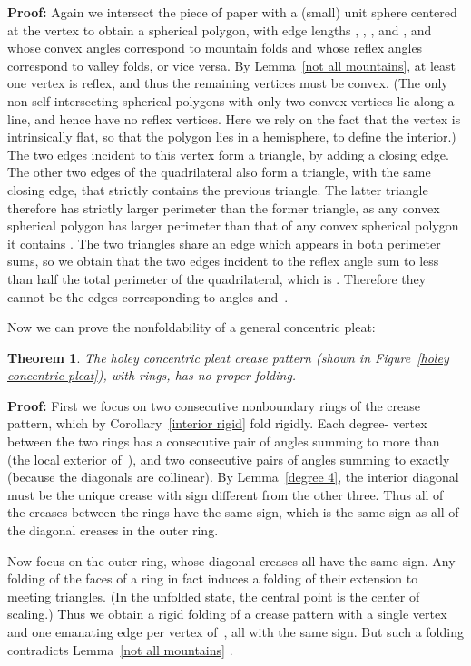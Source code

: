 \documentclass[11pt,letterpaper]{article}
\newtheorem{theorem}{Theorem}
\newenvironment{proof}{\noindent\textbf{Proof: }\ignorespaces}
  {\hspace*{\fill}\medskip}
\begin{document}
\begin{proof}
  Again we intersect the piece of paper with a (small) unit sphere centered
  at the vertex to obtain a spherical polygon, with edge lengths ,
  , , and , and whose convex angles correspond
  to mountain folds and whose reflex angles correspond to valley folds,
  or vice versa.  By Lemma~\ref{not all mountains}, at least one vertex
  is reflex, and thus the remaining vertices must be convex.
  (The only non-self-intersecting spherical polygons with only two convex
   vertices lie along a line, and hence have no reflex vertices.
   Here we rely on the fact that the vertex is intrinsically flat,
   so that the polygon lies in a hemisphere, to define the interior.)
The two edges incident to this vertex form a triangle,
  by adding a closing edge.
  The other two edges of the quadrilateral also form a triangle,
  with the same closing edge, that strictly contains the previous triangle.
  The latter triangle therefore has strictly larger perimeter than the
  former triangle, as any convex spherical polygon has larger perimeter than
  that of any convex spherical polygon it contains
  \cite[page~264, Theorem~III]{Halsted-1885}.
  The two triangles share an edge which appears in both perimeter sums,
  so we obtain that the two edges incident to the reflex angle sum to less
  than half the total perimeter of the quadrilateral, which is .
  Therefore they cannot be the edges corresponding to angles
   and~.
\end{proof}

Now we can prove the nonfoldability of a general concentric pleat:

\begin{theorem}
  The holey concentric pleat crease pattern
  (shown in Figure~\ref{holey concentric pleat}), with  rings,
  has no proper folding.
\end{theorem}

\begin{proof}
  First we focus on two consecutive nonboundary rings of the crease pattern,
  which by Corollary~\ref{interior rigid} fold rigidly.
  Each degree- vertex between the two rings
  has a consecutive pair of angles summing to more than 
  (the local exterior of~), and two consecutive pairs of angles summing to
  exactly  (because the diagonals are collinear).
  By Lemma~\ref{degree 4}, the interior diagonal must be the unique crease
  with sign different from the other three.
  Thus all of the creases between the rings have the same sign,
  which is the same sign as all of the diagonal creases in the outer ring.

  Now focus on the outer ring, whose diagonal creases all have the same sign.
  Any folding of the faces of a ring in fact induces a folding of their
  extension to meeting triangles.
  (In the unfolded state, the central point is the center  of scaling.)
  Thus we obtain a rigid folding of a crease pattern with a single vertex 
  and one emanating edge per vertex of~, all with the same sign.
  But such a folding contradicts Lemma~\ref{not all mountains} .
\end{proof}
\end{document}
